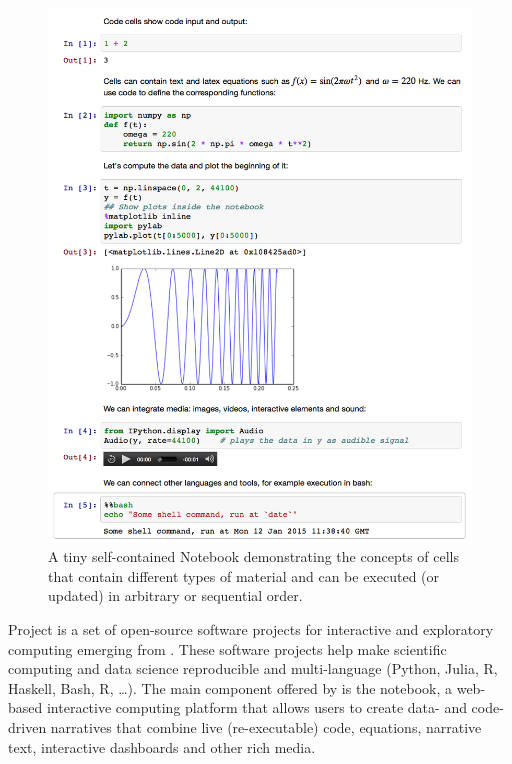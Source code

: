 
\begin{figure}
\includegraphics[scale=0.23]{Pictures/jupyterdemo1.png}
\caption{\label{fig:jupyterdemo} A tiny self-contained Notebook demonstrating the concepts of cells that contain different types of material and can be executed (or updated) in arbitrary or sequential order.}
\end{figure}

Project \Jupyter is a set of open-source software projects for
interactive and exploratory computing emerging from \IPython. These
software projects help make scientific computing and data science
reproducible and multi-language (Python, Julia, R, Haskell, Bash, R,
\ldots). The main component offered by \Jupyter is the \Jupyter
notebook, a web-based interactive computing platform that allows users
to create data- and code-driven narratives that combine live
(re-executable) code, equations, narrative text, interactive
dashboards and other rich media.

